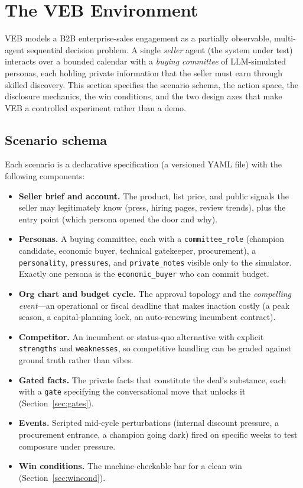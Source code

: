\section{The VEB Environment}
\label{sec:environment}

VEB models a B2B enterprise-sales engagement as a partially observable,
multi-agent sequential decision problem. A single \emph{seller} agent (the system
under test) interacts over a bounded calendar with a \emph{buying committee} of
LLM-simulated personas, each holding private information that the seller must earn
through skilled discovery. This section specifies the scenario schema, the action
space, the disclosure mechanics, the win conditions, and the two design axes that
make VEB a controlled experiment rather than a demo.

\subsection{Scenario schema}
\label{sec:schema}
Each scenario is a declarative specification (a versioned YAML file) with the
following components:

\begin{itemize}[leftmargin=1.4em,itemsep=2pt,topsep=2pt]
  \item \textbf{Seller brief and account.} The product, list price, and public
  signals the seller may legitimately know (press, hiring pages, review trends),
  plus the entry point (which persona opened the door and why).
  \item \textbf{Personas.} A buying committee, each with a \texttt{committee\_role}
  (champion candidate, economic buyer, technical gatekeeper, procurement), a
  \texttt{personality}, \texttt{pressures}, and \texttt{private\_notes} visible
  only to the simulator. Exactly one persona is the \texttt{economic\_buyer} who
  can commit budget.
  \item \textbf{Org chart and budget cycle.} The approval topology and the
  \emph{compelling event}---an operational or fiscal deadline that makes inaction
  costly (a peak season, a capital-planning lock, an auto-renewing incumbent
  contract).
  \item \textbf{Competitor.} An incumbent or status-quo alternative with explicit
  \texttt{strengths} and \texttt{weaknesses}, so competitive handling can be
  graded against ground truth rather than vibes.
  \item \textbf{Gated facts.} The private facts that constitute the deal's
  substance, each with a \texttt{gate} specifying the conversational move that
  unlocks it (Section~\ref{sec:gates}).
  \item \textbf{Events.} Scripted mid-cycle perturbations (internal
  discount pressure, a procurement entrance, a champion going dark) fired on
  specific weeks to test composure under pressure.
  \item \textbf{Win conditions.} The machine-checkable bar for a clean win
  (Section~\ref{sec:wincond}).
\end{itemize}

